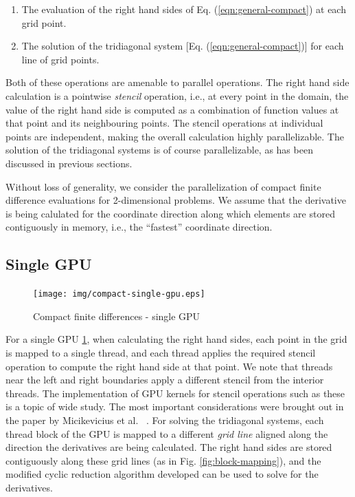\begin{enumerate}
\item The evaluation of the right hand sides
    of Eq. (\ref{eqn:general-compact})
    at each grid point.
\item The solution of the tridiagonal system
    [Eq. (\ref{eqn:general-compact})]
    for each line of grid points.
\end{enumerate}

Both of these operations are amenable to parallel operations.
The right hand side calculation is a pointwise
\emph{stencil} operation, i.e.,
at every point in the domain,
the value of the right hand side
is computed as a combination of function values
at that point and its neighbouring points.
The stencil operations at individual points
are independent,
making the overall calculation highly parallelizable.
The solution of the tridiagonal systems
is of course parallelizable,
as has been discussed in previous sections.

Without loss of generality,
we consider the parallelization of
compact finite difference evaluations for 2-dimensional problems.
We assume that the derivative is being calulated
for the coordinate direction along which
elements are stored contiguously in memory, i.e.,
the ``fastest'' coordinate direction.

\subsection{Single GPU}

\begin{figure}
\begin{center}
\texttt{[image: img/compact-single-gpu.eps]}
\caption{Compact finite differences - single GPU}
\label{fig:compact-single-gpu}
\end{center}
\end{figure}

For a single GPU \ref{fig:compact-single-gpu},
when calculating the right hand sides,
each point in the grid is mapped to a single thread,
and each thread applies the required stencil operation
to compute the right hand side at that point.
We note that threads near the left and right boundaries
apply a different stencil from the interior threads.
The implementation of GPU kernels for
stencil operations such as these is a topic of wide study.
The most important considerations were brought out
in the paper by Micikevicius et al. ~\cite{micikevicius20093d}.
For solving the tridiagonal systems,
each thread block of the GPU is mapped to a
different \emph{grid line}
aligned along the
direction the derivatives are being calculated.
The right hand sides are stored
contiguously along these grid lines
(as in Fig. \ref{fig:block-mapping}),
and the modified cyclic reduction algorithm developed
can be used to solve for the derivatives.


